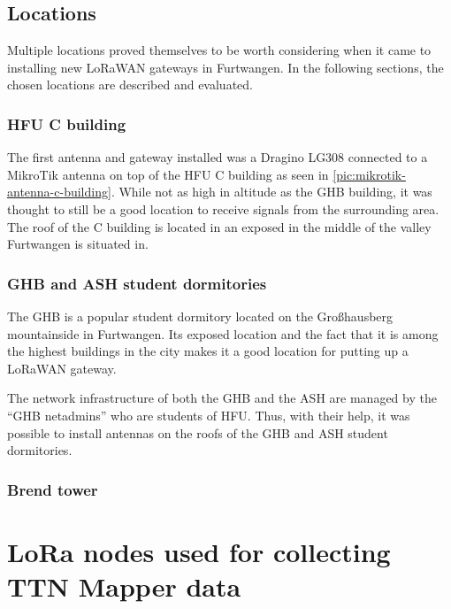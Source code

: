 \subsection{Locations}


Multiple locations proved themselves to be worth considering when it came to installing new \ac{LoRaWAN} gateways in Furtwangen.
In the following sections, the chosen locations are described and evaluated.

\subsubsection{\ac{HFU} C building}

The first antenna and gateway installed was a Dragino LG308 connected to a MikroTik antenna on top of the \ac{HFU} C building as seen in \cref{pic:mikrotik-antenna-c-building}.
While not as high in altitude as the GHB building, it was thought to still be a good location to receive signals from the surrounding area.
The roof of the C building is located in an exposed in the middle of the valley Furtwangen is situated in.

\subsubsection{\acf{GHB} and \acf{ASH} student dormitories}

The \ac{GHB} is a popular student dormitory located on the Großhausberg mountainside in Furtwangen.
Its exposed location and the fact that it is among the highest buildings in the city makes it a good location for putting up a \ac{LoRaWAN} gateway.

The network infrastructure of both the \ac{GHB} and the \ac{ASH} are managed by the ``\ac{GHB} netadmins'' who are students of \ac{HFU}.
Thus, with their help, it was possible to install antennas on the roofs of the GHB and ASH student dormitories.

\subsubsection{Brend tower}


\section{\ac{LoRa} nodes used for collecting TTN Mapper data}

